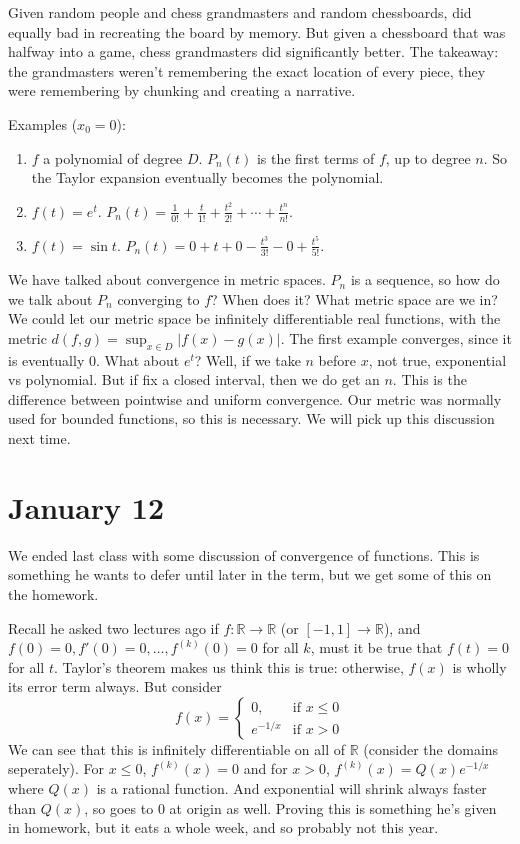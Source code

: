 \documentclass{article}
\theoremstyle{plain}
\theoremstyle{remark}
\newcommand{\R}{{\mathbb R}}
\begin{document}
Given random people and chess grandmasters and random chessboards,
did equally bad in recreating the board by memory.
But given a chessboard that was halfway into a game,
chess grandmasters did significantly better.
The takeaway: the grandmasters weren't remembering the exact location of every piece,
they were remembering by chunking and creating a narrative.

\noindent Examples ($x_0 = 0$):
\begin{enumerate}
	\item $f$ a polynomial of degree $D$.
		$P_n(t)$ is the first terms of $f$, up to degree $n$.
		So the Taylor expansion eventually becomes the polynomial.
	\item $f(t) = e^t$.
		$P_n(t) = \frac{1}{0!} + \frac{t}{1!} + \frac{t^2}{2!} + \cdots + \frac{t^n}{n!}$.
	\item $f(t) = \sin{t}$.
		$P_n(t) = 0 + t + 0 - \frac{t^3}{3!} - 0 + \frac{t^5}{5!}$.
\end{enumerate}

We have talked about convergence in metric spaces.
$P_n$ is a sequence, so how do we talk about $P_n$ converging to $f$?
When does it? What metric space are we in?
We could let our metric space be infinitely differentiable real functions,
with the metric $d(f,g) = \sup_{x\in D}|f(x) - g(x)|$.
The first example converges, since it is eventually $0$.
What about $e^t$?
Well, if we take $n$ before $x$, not true,
exponential vs polynomial.
But if fix a closed interval, then we do get an $n$.
This is the difference between pointwise and uniform convergence.
Our metric was normally used for bounded functions, so this is necessary.
We will pick up this discussion next time.

\section{January 12}
We ended last class with some discussion of convergence of functions.
This is something he wants to defer until later in the term,
but we get some of this on the homework.

Recall he asked two lectures ago if $f \colon \R \to \R$ (or $[-1,1] \to \R$),
and $f(0) = 0, f'(0) = 0, \dots, f^{(k)}(0) = 0$ for all $k$,
must it be true that $f(t) = 0$ for all $t$.
Taylor's theorem makes us think this is true:
otherwise, $f(x)$ is wholly its error term always.
But consider
\[
	f(x) = \begin{cases} 0, & \text{if }x \leq 0\\ e^{-1/x} & \text{if } x > 0 \end{cases}
\]
We can see that this is infinitely differentiable on all of $\R$
(consider the domains seperately).
For $x \leq 0$, $f^{(k)}(x) = 0$ and for $x > 0$, $f^{(k)}(x) = Q(x)e^{-1/x}$
where $Q(x)$ is a rational function.
And exponential will shrink always faster than $Q(x)$,
so goes to $0$ at origin as well.
Proving this is something he's given in homework, but it eats a whole week,
and so probably not this year.
\end{document}
